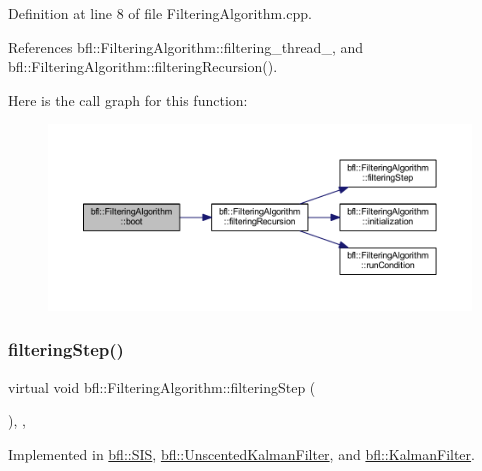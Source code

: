 Definition at line 8 of file Filtering\+Algorithm.\+cpp.



References bfl\+::\+Filtering\+Algorithm\+::filtering\+\_\+thread\+\_\+, and bfl\+::\+Filtering\+Algorithm\+::filtering\+Recursion().

Here is the call graph for this function\+:
\nopagebreak
\begin{figure}[H]
\begin{center}
\leavevmode
\includegraphics[width=350pt]{classbfl_1_1FilteringAlgorithm_a96651f8464190c0a56d79219a1017147_cgraph}
\end{center}
\end{figure}
\mbox{\label{classbfl_1_1FilteringAlgorithm_ab3bceb43b5810a4bf1da884b8a0b145a}} 
\subsubsection{\texorpdfstring{filtering\+Step()}{filteringStep()}}
{\footnotesize\ttfamily virtual void bfl\+::\+Filtering\+Algorithm\+::filtering\+Step (\begin{DoxyParamCaption}{ }\end{DoxyParamCaption})\hspace{0.3cm}{\ttfamily [protected]}, {}, {\ttfamily [inherited]}}



Implemented in \mbox{\hyperlink{classbfl_1_1SIS_a582f06cc5456d2cc6ed8f90087cbbb4c}{bfl\+::\+S\+IS}}, \mbox{\hyperlink{classbfl_1_1UnscentedKalmanFilter_a169451bb711a03ad2dc28a40e3ad867f}{bfl\+::\+Unscented\+Kalman\+Filter}}, and \mbox{\hyperlink{classbfl_1_1KalmanFilter_aac6bd54422cba06e34cb93cb8a659950}{bfl\+::\+Kalman\+Filter}}.



